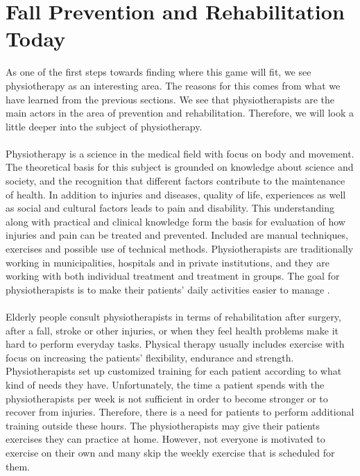 \section{Fall Prevention and Rehabilitation Today}
As one of the first steps towards finding where this game will fit, we see physiotherapy as an interesting area. The reasons for this comes from what we have learned from the previous sections. We see that physiotherapists are the main actors in the area of prevention and rehabilitation. Therefore, we will look a little deeper into the subject of physiotherapy. \\ \\
Physiotherapy is a science in the medical field with focus on body and movement. The theoretical basis for this subject is grounded on knowledge about science and society, and the recognition that different factors contribute to the maintenance of health. In addition to injuries and diseases, quality of life, experiences as well as social and cultural factors leads to pain and disability. This understanding along with practical and clinical knowledge form the basis for evaluation of how injuries and pain can be treated and prevented. Included are manual techniques, exercises and possible use of technical methods. Physiotherapists are traditionally working in municipalities, hospitals and in private institutions, and they are working with both individual treatment and treatment in groups. The goal for physiotherapists is to make their patients' daily activities easier to manage \cite{physiotherapy1}\cite{physiotherapy2}.\\ \\
Elderly people consult physiotherapists in terms of rehabilitation after surgery, after a fall, stroke or other injuries, or when they feel health problems make it hard to perform everyday tasks. Physical therapy usually includes exercise with focus on increasing the patients’ flexibility, endurance and strength. Physiotherapists set up customized training for each patient according to what kind of needs they have. Unfortunately, the time a patient spends with the physiotherapists per week is not sufficient in order to become stronger or to recover from injuries. Therefore, there is a need for patients to perform additional training outside these hours. The physiotherapists may give their patients exercises they can practice at home. However, not everyone is motivated to exercise on their own and many skip the weekly exercise that is scheduled for them. \cite{physiotherapy2} 


